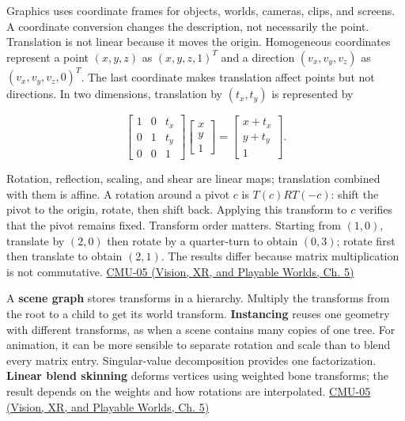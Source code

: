 \hypertarget{03-visual-computing-i-ch001-coordinate-frames-and-affine-transforms}{}

Graphics uses coordinate frames for objects, worlds, cameras, clips, and screens. A coordinate conversion changes the description, not necessarily the point. Translation is not linear because it moves the origin. Homogeneous coordinates represent a point \((x,y,z)\) as \((x,y,z,1)^T\) and a direction \((v_x,v_y,v_z)\) as \((v_x,v_y,v_z,0)^T\). The last coordinate makes translation affect points but not directions. In two dimensions, translation by \((t_x,t_y)\) is represented by

\[
\begin{bmatrix}1&0&t_x\\0&1&t_y\\0&0&1\end{bmatrix}
\begin{bmatrix}x\\y\\1\end{bmatrix}
=\begin{bmatrix}x+t_x\\y+t_y\\1\end{bmatrix}.
\]

Rotation, reflection, scaling, and shear are linear maps; translation combined with them is affine. A rotation around a pivot \(c\) is \(T(c)RT(-c)\): shift the pivot to the origin, rotate, then shift back. Applying this transform to \(c\) verifies that the pivot remains fixed. Transform order matters. Starting from \((1,0)\), translate by \((2,0)\) then rotate by a quarter-turn to obtain \((0,3)\); rotate first then translate to obtain \((2,1)\). The results differ because matrix multiplication is not commutative. \href{../07-Vision-XR-and-Playable-Worlds/main.pdf\#nameddest=04-visual-computing-ii-ch036-cmu-05---spatial-transformations}{CMU-05 (Vision, XR, and Playable Worlds, Ch. 5)}

A \textbf{scene graph} stores transforms in a hierarchy. Multiply the transforms from the root to a child to get its world transform. \textbf{Instancing} reuses one geometry with different transforms, as when a scene contains many copies of one tree. For animation, it can be more sensible to separate rotation and scale than to blend every matrix entry. Singular-value decomposition provides one factorization. \textbf{Linear blend skinning} deforms vertices using weighted bone transforms; the result depends on the weights and how rotations are interpolated. \href{../07-Vision-XR-and-Playable-Worlds/main.pdf\#nameddest=04-visual-computing-ii-ch036-cmu-05---spatial-transformations}{CMU-05 (Vision, XR, and Playable Worlds, Ch. 5)}


